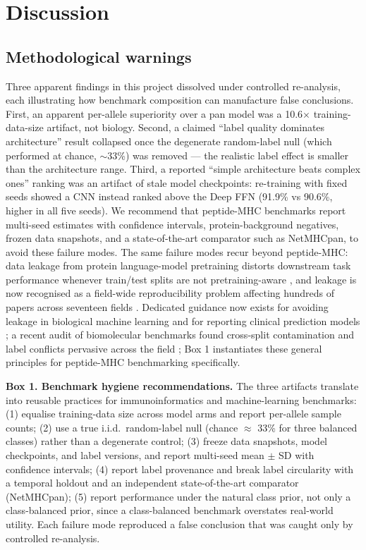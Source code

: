\section{Discussion}\label{sec:discussion}

\subsection{Methodological warnings}
Three apparent findings in this project dissolved under controlled re-analysis, each illustrating how benchmark composition can manufacture false conclusions. First, an apparent per-allele superiority over a pan model was a 10.6$\times$ training-data-size artifact, not biology. Second, a claimed ``label quality dominates architecture'' result collapsed once the degenerate random-label null (which performed at chance, $\sim$33\%) was removed --- the realistic label effect is smaller than the architecture range. Third, a reported ``simple architecture beats complex ones'' ranking was an artifact of stale model checkpoints: re-training with fixed seeds showed a CNN instead ranked above the Deep FFN (91.9\% vs 90.6\%, higher in all five seeds). We recommend that peptide-MHC benchmarks report multi-seed estimates with confidence intervals, protein-background negatives, frozen data snapshots, and a state-of-the-art comparator such as NetMHCpan, to avoid these failure modes. The same failure modes recur beyond peptide-MHC: data leakage from protein language-model pretraining distorts downstream task performance whenever train/test splits are not pretraining-aware \citep{Hermann24}, and leakage is now recognised as a field-wide reproducibility problem affecting hundreds of papers across seventeen fields \citep{Kapoor23}. Dedicated guidance now exists for avoiding leakage in biological machine learning \citep{Bernett24} and for reporting clinical prediction models \citep{Collins24}; a recent audit of biomolecular benchmarks found cross-split contamination and label conflicts pervasive across the field \citep{Schuh26}; Box 1 instantiates these general principles for peptide-MHC benchmarking specifically.

\textbf{Box 1. Benchmark hygiene recommendations.} The three artifacts translate into reusable practices for immunoinformatics and machine-learning benchmarks: (1) equalise training-data size across model arms and report per-allele sample counts; (2) use a true i.i.d.\ random-label null (chance $\approx$ 33\% for three balanced classes) rather than a degenerate control; (3) freeze data snapshots, model checkpoints, and label versions, and report multi-seed mean $\pm$ SD with confidence intervals; (4) report label provenance and break label circularity with a temporal holdout and an independent state-of-the-art comparator (NetMHCpan); (5) report performance under the natural class prior, not only a class-balanced prior, since a class-balanced benchmark overstates real-world utility. Each failure mode reproduced a false conclusion that was caught only by controlled re-analysis.

